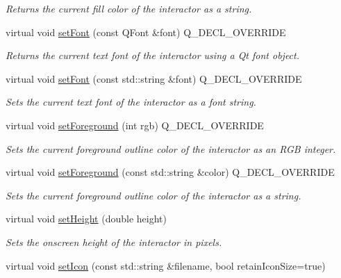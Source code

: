 \begin{DoxyCompactItemize}
\begin{DoxyCompactList}\small\item\em Returns the current fill color of the interactor as a string. \end{DoxyCompactList}\item 
virtual void \mbox{\hyperlink{classGCanvas_a2d22014c7fa3bccfd58c982aea1b55fa}{set\+Font}} (const Q\+Font \&font) Q\+\_\+\+D\+E\+C\+L\+\_\+\+O\+V\+E\+R\+R\+I\+DE
\begin{DoxyCompactList}\small\item\em Returns the current text font of the interactor using a Qt font object. \end{DoxyCompactList}\item 
virtual void \mbox{\hyperlink{classGCanvas_ab39ef411fb13a52852ddd138c5932e2e}{set\+Font}} (const std\+::string \&font) Q\+\_\+\+D\+E\+C\+L\+\_\+\+O\+V\+E\+R\+R\+I\+DE
\begin{DoxyCompactList}\small\item\em Sets the current text font of the interactor as a font string. \end{DoxyCompactList}\item 
virtual void \mbox{\hyperlink{classGCanvas_af9227e80cbfac55ce936fa5c99ffc954}{set\+Foreground}} (int rgb) Q\+\_\+\+D\+E\+C\+L\+\_\+\+O\+V\+E\+R\+R\+I\+DE
\begin{DoxyCompactList}\small\item\em Sets the current foreground outline color of the interactor as an R\+GB integer. \end{DoxyCompactList}\item 
virtual void \mbox{\hyperlink{classGCanvas_a088e04dfc56273df4cedab2b11b970f5}{set\+Foreground}} (const std\+::string \&color) Q\+\_\+\+D\+E\+C\+L\+\_\+\+O\+V\+E\+R\+R\+I\+DE
\begin{DoxyCompactList}\small\item\em Sets the current foreground outline color of the interactor as a string. \end{DoxyCompactList}\item 
virtual void \mbox{\hyperlink{classGInteractor_a9e280bfc4544dfaf8e4376c4e1a74357}{set\+Height}} (double height)
\begin{DoxyCompactList}\small\item\em Sets the onscreen height of the interactor in pixels. \end{DoxyCompactList}\item 
virtual void \mbox{\hyperlink{classGInteractor_a762e139aa311461c3984d3ad28293f64}{set\+Icon}} (const std\+::string \&filename, bool retain\+Icon\+Size=true)

\end{DoxyCompactItemize}
